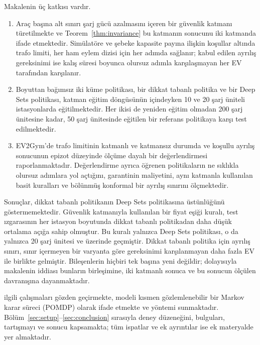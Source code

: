 Makalenin üç katkısı vardır.
\begin{enumerate}
\item Araç başına alt sınırı şarj gücü azalmasını içeren bir güvenlik katmanı türetilmekte ve Teorem~\ref{thm:invariance} bu katmanın sonucunu iki katmanda ifade etmektedir. Simülatöre ve şebeke kapasite payına ilişkin koşullar altında trafo limiti, her ham eylem dizisi için her adımda sağlanır; kabul edilen ayrılış gereksinimi ise kalış süresi boyunca olursuz adımla karşılaşmayan her EV tarafından karşılanır.
\item Boyuttan bağımsız iki küme politikası, bir dikkat tabanlı politika ve bir Deep Sets politikası, katman eğitim döngüsünün içindeyken 10 ve 20 şarj üniteli istasyonlarda eğitilmektedir. Her ikisi de yeniden eğitim olmadan 200 şarj ünitesine kadar, 50 şarj ünitesinde eğitilen bir referans politikaya karşı test edilmektedir.
\item EV2Gym'de trafo limitinin katmanlı ve katmansız durumda ve koşullu ayrılış sonucunun epizot düzeyinde ölçüme dayalı bir değerlendirmesi raporlanmaktadır. Değerlendirme ayrıca öğrenen politikaların ne sıklıkla olursuz adımlara yol açtığını, garantinin maliyetini, aynı katmanla kullanılan basit kuralları ve bölünmüş konformal bir ayrılış sınırını ölçmektedir.
\end{enumerate}
Sonuçlar, dikkat tabanlı politikanın Deep Sets politikasına üstünlüğünü göstermemektedir.
Güvenlik katmanıyla kullanılan bir fiyat eşiği kuralı, test ızgarasının her istasyon boyutunda dikkat tabanlı politikadan daha düşük ortalama açığa sahip olmuştur.
Bu kuralı yalnızca Deep Sets politikası, o da yalnızca 20 şarj ünitesi ve üzerinde geçmiştir.
Dikkat tabanlı politika için ayrılış sınırı, sınır içermeyen bir varyanta göre gereksinimi karşılanmayan daha fazla EV ile birlikte gelmiştir.
Bileşenlerin hiçbiri tek başına yeni değildir; dolayısıyla makalenin iddiası bunların birleşimine, iki katmanlı sonuca ve bu sonucun ölçülen davranışına dayanmaktadır.

 ilgili çalışmaları gözden geçirmekte,  modeli kısmen gözlemlenebilir bir Markov karar süreci (POMDP) olarak ifade etmekte ve  yöntemi sunmaktadır.
Bölüm~\ref{sec:setup}--\ref{sec:conclusion} sırasıyla deney düzeneğini, bulguları, tartışmayı ve sonucu kapsamakta; tüm ispatlar ve ek ayrıntılar ise ek materyalde yer almaktadır.
